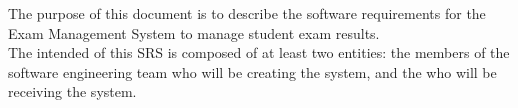 The purpose of this document is to describe the software requirements for the Exam Management System to manage student exam results.
\\
The intended  of this SRS is composed of at least two entities: the members of the software engineering team who will be creating the system, and the  who will be receiving the system.